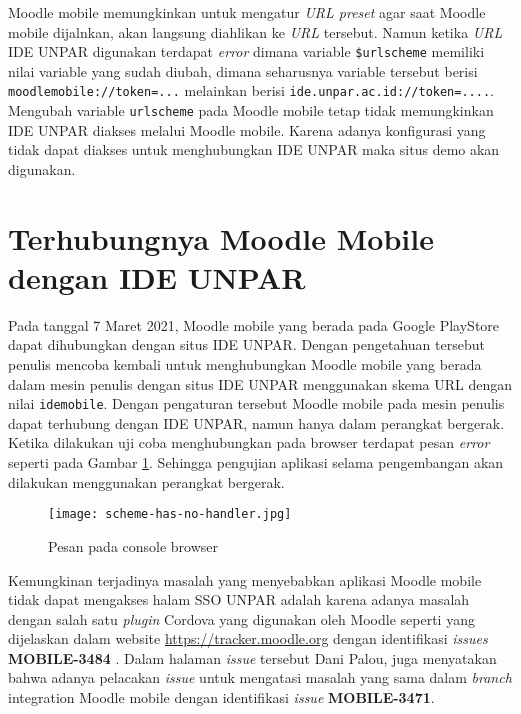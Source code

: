 Moodle mobile memungkinkan untuk mengatur \textit{URL preset} agar saat Moodle mobile dijalnkan, akan langsung diahlikan ke \textit{URL} tersebut. Namun ketika \textit{URL} IDE UNPAR digunakan terdapat \textit{error} dimana variable \texttt{\$urlscheme} memiliki nilai variable yang sudah diubah, dimana seharusnya variable tersebut berisi \texttt{moodlemobile://token=...} melainkan berisi \texttt{ide.unpar.ac.id://token=....}. Mengubah variable \texttt{urlscheme} pada Moodle mobile tetap tidak memungkinkan  IDE UNPAR diakses melalui Moodle mobile. Karena  adanya konfigurasi yang tidak dapat diakses untuk menghubungkan IDE UNPAR maka situs demo akan digunakan.

\section{Terhubungnya Moodle Mobile dengan IDE UNPAR}

Pada tanggal 7 Maret 2021, Moodle mobile yang berada pada Google PlayStore dapat dihubungkan dengan situs IDE UNPAR. Dengan pengetahuan tersebut penulis mencoba kembali untuk menghubungkan Moodle mobile yang berada dalam mesin penulis dengan situs IDE UNPAR menggunakan skema URL dengan nilai \texttt{idemobile}. Dengan pengaturan tersebut Moodle mobile pada mesin penulis dapat terhubung dengan IDE UNPAR, namun hanya dalam perangkat bergerak. Ketika dilakukan uji coba menghubungkan pada browser terdapat pesan \textit{error} seperti pada Gambar \ref{fig:protocolerror}. Sehingga pengujian aplikasi selama pengembangan akan dilakukan menggunakan perangkat bergerak.

\begin{figure}[H] 
	\centering  
	\texttt{[image: scheme-has-no-handler.jpg]}  
	\caption[Pesan pada Console browser] {Pesan pada console browser} 
	\label{fig:protocolerror} 
\end{figure} 

Kemungkinan terjadinya masalah yang menyebabkan aplikasi Moodle mobile tidak dapat mengakses halam SSO UNPAR adalah karena adanya masalah dengan salah satu \textit{plugin} Cordova yang digunakan oleh Moodle seperti yang dijelaskan dalam website \url{https://tracker.moodle.org} dengan identifikasi \textit{issues} \textbf{MOBILE-3484} \cite{moodleTracker:3484}. Dalam halaman \textit{issue} tersebut Dani Palou, juga menyatakan bahwa adanya pelacakan \textit{issue} untuk mengatasi masalah yang sama dalam \textit{branch} integration Moodle mobile dengan identifikasi \textit{issue} \textbf{MOBILE-3471}\cite{moodleTracker:3471}. 


